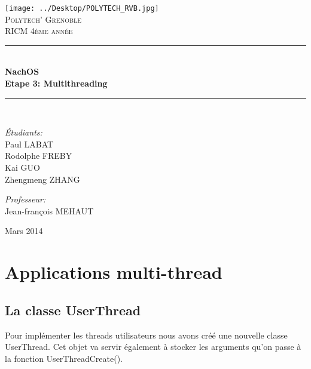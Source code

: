 \documentclass[a4paper,10pt]{article}
\newcommand{\HRule}{\rule{\linewidth}{0.5mm}}
\begin{document}
\begin{titlepage}

\begin{center}


\texttt{[image: ../Desktop/POLYTECH\_RVB.jpg]}\\[1cm]

\textsc{\LARGE Polytech' Grenoble}\\[1.5cm]

\textsc{\Large RICM 4ème année}\\[1.2cm]


\HRule \\[0.4cm]
{ \huge \bfseries NachOS\\[0.6cm]
Etape 3: Multithreading}
\\[0.4cm]

\HRule \\[2cm]

\begin{minipage}{0.4\textwidth}
\begin{flushleft} \large
\emph{\'Etudiants:}\\
Paul \textsc{LABAT} \\
Rodolphe \textsc{FREBY} \\
Kai \textsc{GUO} \\
Zhengmeng \textsc{ZHANG}
\end{flushleft}
\end{minipage}
\begin{minipage}{0.4\textwidth}
\begin{flushright} \large
\emph{Professeur:} \\
Jean-françois \textsc{MEHAUT}
\end{flushright}
\end{minipage}

\vfill

{\large  Mars 2014}

\end{center}

\end{titlepage}

\section{Applications multi-thread}

\subsection{La classe UserThread}
Pour implémenter les threads utilisateurs nous avons créé une nouvelle classe
UserThread. Cet objet va servir également à stocker les arguments qu'on passe à la fonction UserThreadCreate().
\end{document}
